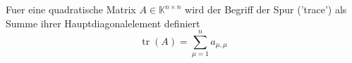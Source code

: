 Fuer eine quadratische Matrix $A \in \mathbb{K}^{n \times n}$ wird der Begriff der Spur ('trace') als Summe ihrer Hauptdiagonalelement definiert
$$\operatorname{tr}(A) = \sum\limits_{\mu = 1}^n a_{\mu, \mu}$$
